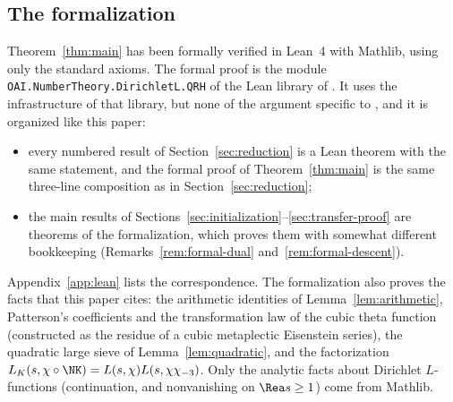 \subsection{The formalization}\label{sec:formal}
Theorem~\ref{thm:main} has been formally verified in Lean~4 with Mathlib, using only the
standard axioms. The formal proof is the module \texttt{OAI.NumberTheory.\allowbreak DirichletL.\allowbreak QRH} of the
Lean library of \cite{OpenAI26}. It uses the infrastructure of that library, but none of the
argument specific to \cite{OpenAI26}, and it is organized like this paper:
\begin{itemize}
\item every numbered result of Section~\ref{sec:reduction} is a Lean theorem with the same
statement, and the formal proof of Theorem~\ref{thm:main} is the same three-line composition as
in Section~\ref{sec:reduction};
\item the main results of Sections~\ref{sec:initialization}--\ref{sec:transfer-proof} are
theorems of the formalization, which proves them with somewhat different bookkeeping
(Remarks~\ref{rem:formal-dual} and~\ref{rem:formal-descent}).
\end{itemize}
Appendix~\ref{app:lean} lists the correspondence. The formalization also proves the facts that
this paper cites: the arithmetic identities of Lemma~\ref{lem:arithmetic}, Patterson's
coefficients and the transformation law of the cubic theta function (constructed as the residue
of a cubic metaplectic Eisenstein series), the quadratic large sieve of Lemma~\ref{lem:quadratic},
and the factorization $L_K(s,\chi\circ\NK)=L(s,\chi)L(s,\chi\chi_{-3})$. Only the analytic facts
about Dirichlet $L$-functions (continuation, and nonvanishing on $\Rea s\ge1$) come from Mathlib.

